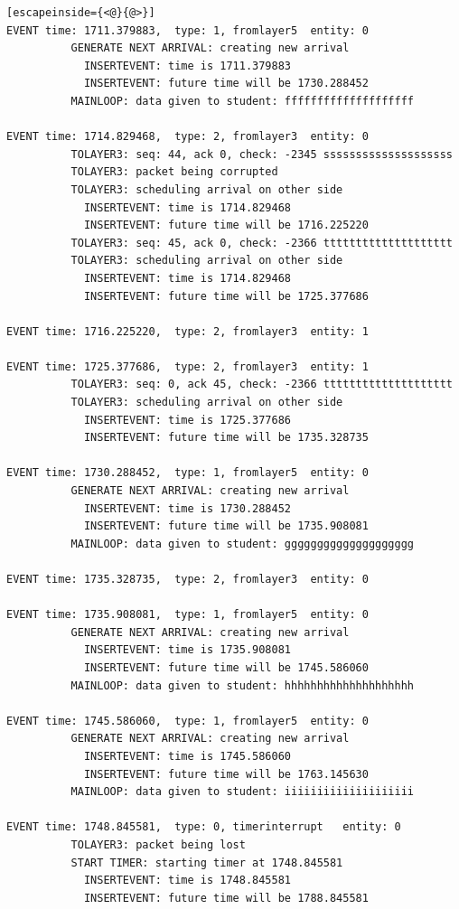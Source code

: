 \documentclass[paper=a4, fontsize=11pt]{scrartcl}
\numberwithin{equation}{section}		%
\numberwithin{figure}{section}			%
\numberwithin{table}{section}				%
\begin{document}
\begin{lstlisting}[escapeinside={<@}{@>}]
EVENT time: 1711.379883,  type: 1, fromlayer5  entity: 0
          GENERATE NEXT ARRIVAL: creating new arrival
            INSERTEVENT: time is 1711.379883
            INSERTEVENT: future time will be 1730.288452
          MAINLOOP: data given to student: ffffffffffffffffffff

EVENT time: 1714.829468,  type: 2, fromlayer3  entity: 0
          TOLAYER3: seq: 44, ack 0, check: -2345 ssssssssssssssssssss
          TOLAYER3: packet being corrupted
          TOLAYER3: scheduling arrival on other side
            INSERTEVENT: time is 1714.829468
            INSERTEVENT: future time will be 1716.225220
          TOLAYER3: seq: 45, ack 0, check: -2366 tttttttttttttttttttt
          TOLAYER3: scheduling arrival on other side
            INSERTEVENT: time is 1714.829468
            INSERTEVENT: future time will be 1725.377686

EVENT time: 1716.225220,  type: 2, fromlayer3  entity: 1

EVENT time: 1725.377686,  type: 2, fromlayer3  entity: 1
          TOLAYER3: seq: 0, ack 45, check: -2366 tttttttttttttttttttt
          TOLAYER3: scheduling arrival on other side
            INSERTEVENT: time is 1725.377686
            INSERTEVENT: future time will be 1735.328735

EVENT time: 1730.288452,  type: 1, fromlayer5  entity: 0
          GENERATE NEXT ARRIVAL: creating new arrival
            INSERTEVENT: time is 1730.288452
            INSERTEVENT: future time will be 1735.908081
          MAINLOOP: data given to student: gggggggggggggggggggg

EVENT time: 1735.328735,  type: 2, fromlayer3  entity: 0

EVENT time: 1735.908081,  type: 1, fromlayer5  entity: 0
          GENERATE NEXT ARRIVAL: creating new arrival
            INSERTEVENT: time is 1735.908081
            INSERTEVENT: future time will be 1745.586060
          MAINLOOP: data given to student: hhhhhhhhhhhhhhhhhhhh

EVENT time: 1745.586060,  type: 1, fromlayer5  entity: 0
          GENERATE NEXT ARRIVAL: creating new arrival
            INSERTEVENT: time is 1745.586060
            INSERTEVENT: future time will be 1763.145630
          MAINLOOP: data given to student: iiiiiiiiiiiiiiiiiiii

EVENT time: 1748.845581,  type: 0, timerinterrupt   entity: 0
          TOLAYER3: packet being lost
          START TIMER: starting timer at 1748.845581
            INSERTEVENT: time is 1748.845581
            INSERTEVENT: future time will be 1788.845581


\end{lstlisting}
\end{document}

